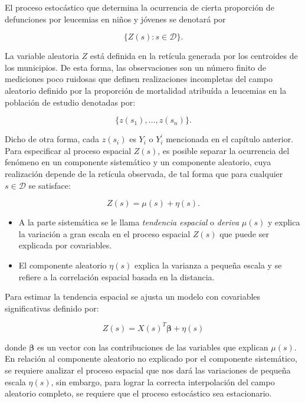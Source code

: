 \documentclass[11pt, oneside]{book}
\begin{document}
El proceso estocástico que determina la ocurrencia de cierta proporción de defunciones por leucemias en niños y jóvenes se denotará por

$$\{Z(s): s\in\mathcal{D}\}.$$

\bigskip

La variable aleatoria $Z$ está definida en la retícula generada por los centroides de los municipios. De esta forma, las observaciones son un número finito de mediciones poco ruidosas que definen realizaciones incompletas del campo aleatorio definido por la proporción de mortalidad atribuída a leucemias en la población de estudio denotadas por: 

$$\{z(s_1),\ldots,z(s_n)\}.$$

\bigskip

Dicho de otra forma, cada $z(s_i)$ es $Y_i$ o $Y_i^{'}$ mencionada en el capítulo anterior.\\

Para especificar al proceso espacial $Z(s)$, es posible separar la ocurrencia del fenómeno en un componente sistemático y un componente aleatorio, cuya realización depende de la retícula observada, de tal forma que para cualquier $s\in\mathcal{D}$ se satisface:

$$Z(s) = \mu(s) +  \eta(s).$$

\begin{itemize}
  \item A la parte sistemática se le llama \emph{tendencia espacial} o \emph{deriva} $\mu(s)$ y explica la variación a gran escala en el proceso espacial $Z(s)$ que puede ser explicada por covariables.
  \item El componente aleatorio $\eta(s)$ explica la varianza a pequeña escala y se refiere a la correlación espacial basada en la distancia.
\end{itemize}

\bigskip

Para estimar la tendencia espacial se ajusta un modelo con covariables significativas definido por:

$$Z(s)=X(s)^T\mathbf{\beta}+\eta(s)$$

\noindent donde $\mathbf{\beta}$ es un vector con las contribuciones de las variables que explican $\mu(s)$.\\

En relación al componente aleatorio no explicado por el componente sistemático, se requiere analizar el proceso espacial que nos dará las variaciones de pequeña escala $\eta(s)$, sin embargo, para lograr la correcta interpolación del campo aleatorio completo, se requiere que el proceso estocástico sea estacionario.\\
\end{document}
